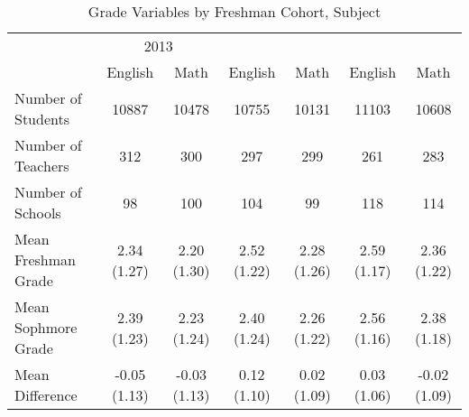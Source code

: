 \begin{table}

\caption{\label{tab:table_freq}Grade Variables by Freshman Cohort, Subject\label{tab:table_freq}}
\centering
\begin{tabular}[t]{lcccccc}
\toprule
\multicolumn{1}{c}{ } & \multicolumn{2}{c}{2013} \\
\cmidrule(l{3pt}r{3pt}){2-3}
  & English & Math & English & Math & English & Math\\
\midrule
Number of Students & 10887 & 10478 & 10755 & 10131 & 11103 & 10608\\
Number of Teachers & 312 & 300 & 297 & 299 & 261 & 283\\
Number of Schools & 98 & 100 & 104 & 99 & 118 & 114\\
\addlinespace
Mean Freshman Grade & 2.34 (1.27) & 2.20 (1.30) & 2.52 (1.22) & 2.28 (1.26) & 2.59 (1.17) & 2.36 (1.22)\\
Mean Sophmore Grade & 2.39 (1.23) & 2.23 (1.24) & 2.40 (1.24) & 2.26 (1.22) & 2.56 (1.16) & 2.38 (1.18)\\
Mean Difference & -0.05 (1.13) & -0.03 (1.13) & 0.12 (1.10) & 0.02 (1.09) & 0.03 (1.06) & -0.02 (1.09)\\
\bottomrule
\end{tabular}
\end{table}
